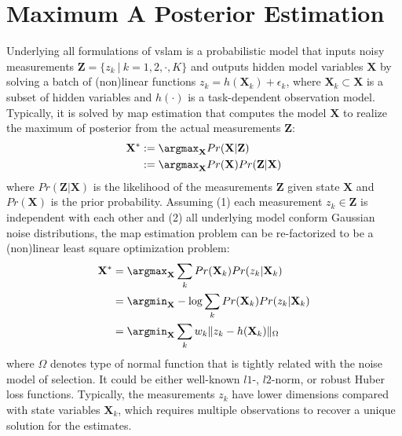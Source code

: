 \section{Maximum A Posterior Estimation} 
\label{sec:preliminaries_map}
Underlying all formulations of \acrshort{vslam} is a probabilistic model that inputs noisy measurements $\mathbf{Z} = \{ z_k \ | \ k = 1, 2, \cdot, K \}$ and outputs hidden model variables $\mathbf{X}$ by solving a batch of (non)linear functions $z_k = h(\mathbf{X}_k) + \epsilon_k$, where $\mathbf{X}_k \subset \mathbf{X}$ is a subset of hidden variables and $h(\cdot)$ is a task-dependent observation model.  
Typically, it is solved by \acrshort{map} estimation that computes the model $\mathbf{X}$ to realize the maximum of posterior from the actual measurements $\mathbf{Z}$:
\begin{equation} \label{eq:preliminaries_probmodel}
\begin{split}
\mathbf{X}^* &:=  \argmax_{\mathbf{X}} Pr(\mathbf{X} | \mathbf{Z}) \\
&:= \argmax_{\mathbf{X}} Pr(\mathbf{X}) Pr(\mathbf{Z} | \mathbf{X}) 
\end{split}
\end{equation} 
where $Pr(\mathbf{Z} | \mathbf{X})$ is the likelihood of the measurements $\mathbf{Z}$ given state $\mathbf{X}$ and $Pr(\mathbf{X})$ is the prior probability. 
Assuming (1) each measurement $z_k \in \mathbf{Z}$ is independent with each other and (2) all underlying model conform Gaussian noise distributions, the \acrshort{map} estimation problem can be re-factorized to be a (non)linear least square optimization problem:
\begin{equation} \label{eq:preliminaries_lsmodel}
\begin{split}
\mathbf{X}^* &= \argmax_{\mathbf{X}} \sum_{k} Pr(\mathbf{X}_k) Pr(z_k | \mathbf{X}_k) \\
&=  \argmin_{\mathbf{X}} -\log \sum_{k} Pr(\mathbf{X}_k) Pr(z_k | \mathbf{X}_k) \\
&= \argmin_{\mathbf{X}} \sum_{k} w_k \| z_k - h(\mathbf{X}_k) \|_{\Omega}
\end{split}
\end{equation} 
where $\Omega$ denotes type of normal function that is tightly related with the noise model of selection.
It could be either well-known $l1$-, $l2$-norm, or robust Huber loss functions.
Typically, the measurements $z_k$ have lower dimensions compared with state variables $\mathbf{X}_k$, which requires multiple observations to recover a unique solution for the estimates.
 
